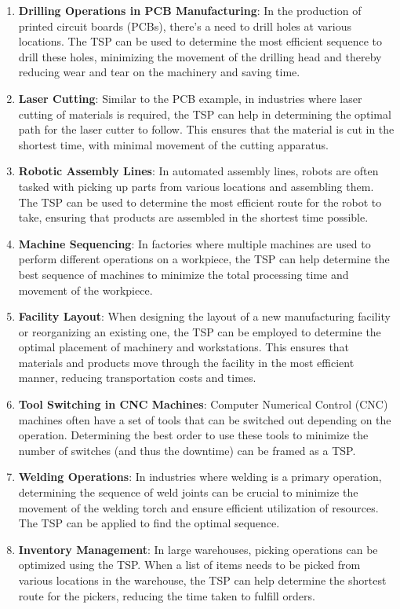 \begin{enumerate}
    \item \textbf{Drilling Operations in PCB Manufacturing}: In the production of printed circuit boards (PCBs), there's a need to drill holes at various locations. The TSP can be used to determine the most efficient sequence to drill these holes, minimizing the movement of the drilling head and thereby reducing wear and tear on the machinery and saving time.
    
    \item \textbf{Laser Cutting}: Similar to the PCB example, in industries where laser cutting of materials is required, the TSP can help in determining the optimal path for the laser cutter to follow. This ensures that the material is cut in the shortest time, with minimal movement of the cutting apparatus.
    
    \item \textbf{Robotic Assembly Lines}: In automated assembly lines, robots are often tasked with picking up parts from various locations and assembling them. The TSP can be used to determine the most efficient route for the robot to take, ensuring that products are assembled in the shortest time possible.
    
    \item \textbf{Machine Sequencing}: In factories where multiple machines are used to perform different operations on a workpiece, the TSP can help determine the best sequence of machines to minimize the total processing time and movement of the workpiece.
    
    \item \textbf{Facility Layout}: When designing the layout of a new manufacturing facility or reorganizing an existing one, the TSP can be employed to determine the optimal placement of machinery and workstations. This ensures that materials and products move through the facility in the most efficient manner, reducing transportation costs and times.
    
    \item \textbf{Tool Switching in CNC Machines}: Computer Numerical Control (CNC) machines often have a set of tools that can be switched out depending on the operation. Determining the best order to use these tools to minimize the number of switches (and thus the downtime) can be framed as a TSP.
    
    \item \textbf{Welding Operations}: In industries where welding is a primary operation, determining the sequence of weld joints can be crucial to minimize the movement of the welding torch and ensure efficient utilization of resources. The TSP can be applied to find the optimal sequence.
    
    \item \textbf{Inventory Management}: In large warehouses, picking operations can be optimized using the TSP. When a list of items needs to be picked from various locations in the warehouse, the TSP can help determine the shortest route for the pickers, reducing the time taken to fulfill orders.
\end{enumerate}



